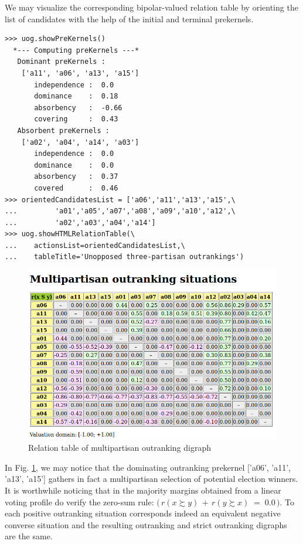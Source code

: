 We may visualize the corresponding bipolar-valued relation table by orienting the list of candidates with the help of the initial and terminal prekernels.
\begin{lstlisting}[caption={Computing unopposed multiobjective outranking situations},label=list:20.4]
>>> uog.showPreKernels()
  *--- Computing preKernels ---*
   Dominant preKernels :
    ['a11', 'a06', 'a13', 'a15']
       independence :  0.0
       dominance    :  0.18
       absorbency   :  -0.66
       covering     :  0.43
   Absorbent preKernels :
    ['a02', 'a04', 'a14', 'a03']
       independence :  0.0
       dominance    :  0.0
       absorbency   :  0.37
       covered      :  0.46
>>> orientedCandidatesList = ['a06','a11','a13','a15',\
...         'a01','a05','a07','a08','a09','a10','a12',\
...         'a02','a03','a04','a14']
>>> uog.showHTMLRelationTable(\
...    actionsList=orientedCandidatesList,\
...    tableTitle='Unopposed three-partisan outrankings')
\end{lstlisting}
\begin{figure}[h]
\includegraphics[width=12cm]{Figures/unOpposedOutrankings.png}
\caption{Relation table of multipartisan outranking digraph} 
\label{fig:20.1}       %
\end{figure}

In Fig. \ref{fig:20.1}, we may notice that the dominating outranking prekernel ['a06', 'a11', 'a13', 'a15'] gathers in fact a multipartisan selection of potential election winners. It is worthwhile noticing that in the majority margins obtained from a linear voting profile do verify the zero-sum rule: $\big(\,r(x \succsim y) \,+\, r(y \succsim x) \;=\; 0.0\,\big)$. To each positive outranking situation corresponds indeed an equivalent negative converse situation and the resulting outranking and strict outranking digraphs are the same.

